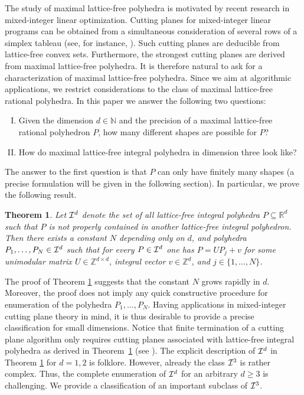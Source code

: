 \documentclass[a4paper]{article}
\theoremstyle{plain}
\newtheorem{theorem}[nn]{Theorem}
\begin{document}
The study of maximal lattice-free polyhedra is motivated by
recent research in mixed-integer linear optimization.
Cutting planes for mixed-integer linear programs can be
obtained from a simultaneous consideration of several rows
of a simplex tableau (see, for instance,
\cite{anlowe2,AndersenLouveauxWeismantelWolsey07,AndersenWagnerWeismantel09,Balas71,BasuBonamiCornuejolsMargot09,boco,CornuejolsMargot08,DeyRichard08,DeyWolsey08,Espinoza08,Zambelli09}).
Such cutting planes are deducible from lattice-free convex
sets.
Furthermore, the strongest cutting planes are derived from
maximal lattice-free polyhedra. 
It is therefore natural to ask for a characterization of
maximal lattice-free polyhedra.
Since we aim at algorithmic applications, we restrict
considerations to the class of maximal lattice-free rational
polyhedra.
In this paper we answer the following two questions:
\begin{enumerate}[I.]
  \item Given the dimension $d \in {\mathbb{N}}$ and the precision
    of a maximal lattice-free rational polyhedron $P$, how
    many different shapes are possible for $P$?
  \item How do maximal lattice-free integral polyhedra in
    dimension three look like? 
\end{enumerate}  
The answer to the first question is that $P$ can only have
finitely many shapes (a precise formulation will be given in
the following section).
In particular, we prove the following result.

\begin{theorem} \label{explicit.statement}
Let ${\cal I}^d$ denote the set of all lattice-free integral
polyhedra $P \subseteq {\mathbb{R}}^d$  such that $P$ is not
properly contained in another lattice-free integral
polyhedron.
Then there exists a constant $N$ depending only on $d$, and
polyhedra $P_1,\ldots,P_N \in {\cal I}^d$ such that for
every $P \in {\cal I}^d$ one has  $P = UP_j + v$ for some
unimodular matrix $U \in {\mathbb{Z}}^{d \times d}$, integral vector
$v \in {\mathbb{Z}}^d$, and $j \in \{1, \dots, N\}$.
\end{theorem}

The proof of Theorem \ref{explicit.statement} suggests that
the constant $N$ grows rapidly in $d$.
Moreover, the proof does not imply any quick constructive
procedure for enumeration of the polyhedra
$P_1,\ldots,P_N$.
Having applications in mixed-integer cutting plane theory in
mind, it is thus desirable to provide  a precise
classification for small dimensions.
Notice that finite termination of a cutting plane algorithm
only requires cutting planes associated with lattice-free
integral polyhedra as derived in
Theorem~\ref{explicit.statement} (see
\cite{BasuCornuejolsMargot10,DeyLouveaux09,DelPiaWeismantel10}).
The explicit description of ${\cal I}^d$ in Theorem
\ref{explicit.statement} for $d = 1,2$ is folklore.
However, already the class ${\cal I}^3$ is rather complex.
Thus, the complete enumeration of ${\cal I}^d$ for an
arbitrary $d \ge 3$ is challenging.
We provide a classification of an important subclass of
${\cal I}^3$.
\end{document}
